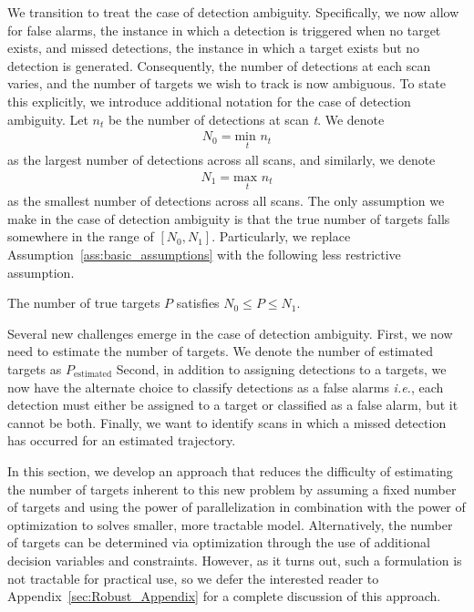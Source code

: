 We transition to treat the case of detection ambiguity. Specifically, we now allow for false alarms, the instance in which a detection is triggered when no target exists, and missed detections, the instance in which a target exists but no detection is generated. Consequently, the number of detections at each scan varies, and the number of targets we wish to track is now ambiguous. To state this explicitly, we introduce additional notation for the case of detection ambiguity. Let $n_{t}$ be the number of detections at scan \textit{t}. We denote 
\begin{align*}
N_{0} = \underset{t}{\text{min }} n_{t}
\end{align*}
as the largest number of detections across all scans, and similarly, we denote
\begin{align*}
N_{1} = \underset{t}{\text{max }}  n_{t}
\end{align*}
as the smallest number of detections across all scans. The only assumption we make in the case of detection ambiguity is that the true number of targets falls somewhere in the range of $[N_{0},N_{1}]$. Particularly, we replace Assumption~\ref{ass:basic_assumptions} with the following less restrictive assumption.
\begin{assumption}\label{ass:robust_assumptions}
\item The number of true targets $P$ satisfies $N_0\leq P \leq N_1$.
\end{assumption}

Several new challenges emerge in the case of detection ambiguity. First, we now need to estimate the number of targets. We denote the number of estimated targets as $P_{\text{estimated}}$ Second, in addition to assigning detections to a targets, we now have the alternate choice to classify detections as a false alarms \textit{i.e.}, each detection must either be assigned to a target or classified as a false alarm, but it cannot be both. Finally, we want to identify scans in which a missed detection has occurred for an estimated trajectory. 

In this section, we develop an approach that reduces the difficulty of estimating the number of targets inherent to this new problem by assuming a fixed number of targets and using the power of parallelization in combination with the power of optimization to solves smaller, more tractable model. Alternatively, the number of targets can be determined via optimization through the use of additional decision variables and constraints. However, as it turns out, such a formulation is not tractable for practical use, so we defer the interested reader to Appendix~\ref{sec:Robust_Appendix} for a complete discussion of this approach. 
 
